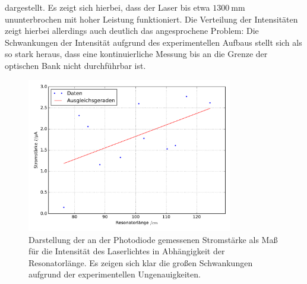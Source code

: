 dargestellt. Es zeigt sich hierbei, dass der Laser bis etwa $\SI{1300}{\milli\meter}$ ununterbrochen mit hoher Leistung funktioniert.
Die Verteilung der Intensitäten zeigt hierbei allerdings auch deutlich das angesprochene Problem: Die Schwankungen der Intensität aufgrund
des experimentellen Aufbaus stellt sich als so stark heraus, dass eine kontinuierliche Messung bis an die Grenze der optischen Bank nicht
durchführbar ist.
%
\begin{figure}[htb]
  \centering
  \includegraphics[width=0.8\textwidth]{auswertung/plot_kk.pdf}
  \caption{Darstellung der an der Photodiode gemessenen Stromstärke als Maß für die Intensität des Laserlichtes in Abhängigkeit der Resonatorlänge. Es zeigen sich klar die großen Schwankungen aufgrund der experimentellen Ungenauigkeiten.}
  \label{fig:kk}
\end{figure}
%
